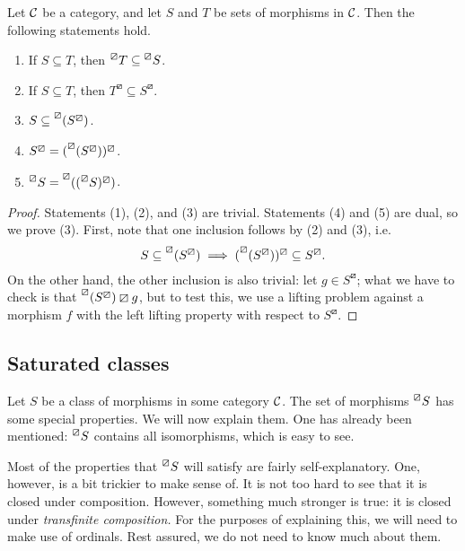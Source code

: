 \begin{proposition}
	Let \(\mathcal{C}\) be a category, and let \(S\) and \(T\) be sets of morphisms in \(\mathcal{C}\). Then the following statements hold.
	\begin{enumerate}[label=(\arabic*)]
		\item If \(S\subseteq T\), then \(\prescript{\boxslash}{}{T}\subseteq\prescript{\boxslash}{}{S}\).
		\item If \(S\subseteq T\), then \(T^\boxslash\subseteq S^\boxslash\).
		\item \(S \subseteq \prescript{\boxslash}{}{(S^\boxslash)}\).
		\item \(S^\boxslash = (\prescript{\boxslash}{}{(S^\boxslash)})^\boxslash\).
		\item \(\prescript{\boxslash}{}{S} = \prescript{\boxslash}{}{((\prescript{\boxslash}{}{S})^\boxslash)}\).
	\end{enumerate}
\end{proposition}
\begin{proof}
Statements (1), (2), and (3) are trivial. Statements (4) and (5) are dual, so we prove (3). First, note that one inclusion follows by (2) and (3), i.e.
\[ S \subseteq \prescript{\boxslash}{}{(S^\boxslash)} \implies (\prescript{\boxslash}{}{(S^\boxslash)})^\boxslash \subseteq S^\boxslash. \]
On the other hand, the other inclusion is also trivial: let \(g\in S^\boxslash\); what we have to check is that \(\prescript{\boxslash}{}{(S^\boxslash)} \boxslash g\),
but to test this, we use a lifting problem against a morphism \(f\) with the left lifting property with respect to \(S^\boxslash\).
\end{proof}

\subsection{Saturated classes}

Let \(S\) be a class of morphisms in some category \(\mathcal{C}\). The set of morphisms \(\prescript{\boxslash}{}{S}\) has some special properties. We will now explain them.
One has already been mentioned: \(\prescript{\boxslash}{}{S}\) contains all isomorphisms, which is easy to see.

Most of the properties that \(\prescript{\boxslash}{}{S}\) will satisfy are fairly self-explanatory. One, however, is a bit trickier to make sense of. It is not too hard to see
that it is closed under composition. However, something much stronger is true: it is closed under \emph{transfinite composition.} For the purposes of explaining this,
we will need to make use of ordinals. Rest assured, we do not need to know much about them.

